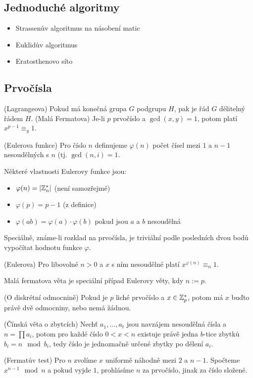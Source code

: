 \subsection{Jednoduché algoritmy}
\begin{itemize}
	\item Strassenův algoritmus na násobení matic
	\item Euklidův algoritmus
	\item Eratosthenovo síto
\end{itemize}
\subsection{Prvočísla}

\vt (Lagrangeova) Pokud má konečná grupa $G$ podgrupu $H$, pak je řád $G$
dělitelný řádem $H$.
\vt (Malá Fermatova) Je-li $p$ prvočíslo a $\gcd(x,y) = 1$, potom platí $x^{p-1}
\equiv_y 1$.

\df (Eulerova funkce) Pro číslo $n$ definujeme $\varphi(n)$ počet čísel mezi $1$
a $n-1$ nesoudělných s $n$ (tj. $\gcd(n,i) = 1$.

\poz Některé vlastnosti Eulerovy funkce jsou:
\begin{itemize}
	\item $\varphi(n) = |\mathbb{Z}_n^*|$ (není samozřejmé)
	\item $\varphi(p) = p-1$ (z definice)
	\item $\varphi(ab) = \varphi(a) \cdot \varphi(b)$ pokud jsou $a$ a $b$
		nesoudělná
\end{itemize}
Speciálně, známe-li rozklad na prvočísla, je triviální podle posledních dvou
bodů vypočítat hodnotu funkce $\varphi$.

\vt (Eulerova) Pro libovolné $n > 0$ a $x$ s ním nesoudělné platí
$x^{\varphi(n)} \equiv_n 1$.

\poz Malá fermatova věta je speciální případ Eulerovy věty, kdy $n := p$.

\vt (O diskrétní odmocnině) Pokud je $p$ liché prvočíslo a $x \in \mathbb{Z}_p^*$, potom
má $x$ buďto právě dvě odmocniny, nebo nemá žádnou.

\vt (Čínská věta o zbytcích) Nechť $a_1, \dots, a_t$ jsou navzájem nesoudělná
čísla a $n = \prod a_i$, potom pro každé číslo $0 < x < n$ existuje právě jedna
$b$-tice zbytků $b_i = n \mod b_i$, tedy číslo je jednoznačně určené zbytky po
dělení $a_i$.

\alg (Fermatův test) Pro $n$ zvolíme $x$ uniformě náhodně mezi $2$ a $n-1$.
Spočteme $x^{n-1} \mod n$ a pokud vyjde $1$, prohlásíme $n$ za prvočíslo, jinak
za číslo složené.

